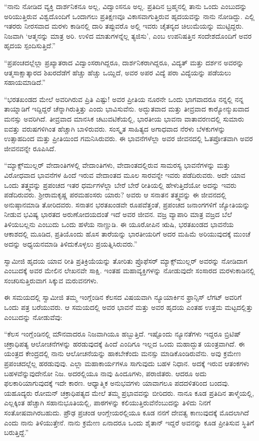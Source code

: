  “ನಾನು ನೋಡಿದ ವ್ಯಕ್ತಿ ದಾರ್ಶನಿಕನೂ ಅಲ್ಲ, ವಿದ್ವಾಂಸನೂ ಅಲ್ಲ. ಪ್ರತಿದಿನ ಬ್ರಹ್ಮನಲ್ಲಿ ತಾನು ಒಂದು ಎಂಬುದನ್ನು ಅರಿಯುತ್ತಿರುವ ವಿಶ್ವದೊಂದಿಗೆ ಒಂದಾಗಲು ಪ್ರತಿಕ್ಷಣವೂ ವಿಕಾಸವಾಗುತ್ತಿರುವ ಹೃದಯವನ್ನು ನಾನು ನೋಡಿದ್ದು. ಎಲ್ಲಿ ಇತರರು ನೀರಸವಾದ ಮರಳು ಕಾಡಿನಲ್ಲಿ ದಾರಿ ತಪ್ಪುವರೊ ಅಲ್ಲಿ ಇವರು ಚೈತನ್ಯದ ಚಿಲುಮೆಯನ್ನು ಮುಟ್ಟಿದ್ದರು. ನಿಜವಾಗಿ ‘ಆತ್ಮನನ್ನು ಮಾತ್ರ ಅರಿ. ಉಳಿದ ಮಾತುಗಳನ್ನೆಲ್ಲ ತ್ಯಜಿಸು’, ಎಂಬ ಉಪನಿಷತ್ತಿನ ಸಂದೇಶದೊಂದಿಗೆ ಅವರ ಹೃದಯ ಸ್ಪಂದಿಸುತ್ತಿದೆ.” 

 “ಪ್ರಪಂಚದಲ್ಲೆಲ್ಲಾ ಪ್ರಖ್ಯಾತರಾದ ವಿದ್ವಾಂಸರಾಗಿದ್ದರೂ, ದಾರ್ಶನಿಕರಾಗಿದ್ದರೂ, ವಿದ್ಯತ್ ಮತ್ತು ದರ್ಶನ ಅವರನ್ನು ಆತ್ಮಸಾಕ್ಷಾತ್ಕಾರದ ಶಿಖರದೆಡೆಗೆ ಹೆಚ್ಚು ಹೆಚ್ಚು ಒಯ್ದಿದೆ, ಅವರ ಅಪರ ವಿದ್ಯೆ ಪರಾ ವಿದ್ಯೆಯನ್ನು ಪಡೆಯಲು ಸಹಾಯಮಾಡಿದೆ.” 

 “ಭರತಖಂಡದ ಮೇಲೆ ಅವರಿಗಿರುವ ಪ್ರಿತಿ ಎಷ್ಟು! ಅವರ ಪ್ರೀತಿಯ ನೂರನೇ ಒಂದು ಭಾಗವಾದರೂ ನನ್ನಲ್ಲಿ ನನ್ನ ತಾಯ್ನಾಡಿಗೆ ಇದ್ದಿದ್ದರೆ ಚೆನ್ನಾಗಿರುತ್ತಿತ್ತು ಎಂದು ಭಾವಿಸುವೆನು. ಅದ್ಭುತವಾದ ಮತ್ತು ತೀವ್ರವಾದ ಕಾರ‍್ಯೋನ್ಮುಖವಾದ ಮನಸ್ಸು ಅವರಿಗಿದೆ. ತೀವ್ರವಾದ ಮಾನಸಿಕ ಚಟುವಟಿಕೆಯಲ್ಲಿ, ಭಾರತೀಯ ಭಾವನಾ ವಾತಾವರಣದಲ್ಲಿ ಸುಮಾರು ಐವತ್ತು ವರುಷಗಳಿಗಿಂತ ಹೆಚ್ಚಾಗಿ ಬಾಳಿರುವರು. ಸಂಸ್ಕೃತ ಸಾಹಿತ್ಯದ ಅಗಾಧವಾದ ನೆರಳು ಬೆಳಕುಗಳನ್ನು ಉತ್ಸಾಹದಿಂದ ಮತ್ತು ಪ್ರೀತಿಯಿಂದ ಗಮನಿಸಿರುವರು. ಈ ಭಾವನೆಗಳೆಲ್ಲಾ ಅವರ ಜೀವನದಲ್ಲಿ ಓತಪ್ರೋತವಾಗಿ ಅವರ ಜೀವನವನ್ನೇ ರೂಪಿಸಿದೆ. 

 “ಮ್ಯಾಕ್ಸ್‌ಮುಲ್ಲರ್ ವೇದಾಂತಿಗಳಲ್ಲಿ ವೇದಾಂತಿಗಳು, ವೇದಾಂತದಲ್ಲಿರುವ ಸಾಮರಸ್ಯ ಭಾವನೆಗಳನ್ನು ಮತ್ತು ವಿರೋಧವಾದ ಭಾವನೆಗಳ ಹಿಂದೆ ಇರುವ ವೇದಾಂತದ ಮೂಲ ಸಾರವನ್ನೇ ಇವರು ಪಡೆದಿರುವರು. ಅದೇ ಯಾವ ಒಂದು ತತ್ತ್ವವನ್ನು ಪ್ರಪಂಚದ ಇತರ ಧರ್ಮಗಳೆಲ್ಲಾ ಬೇರೆ ಬೇರೆ ರೀತಿಯಲ್ಲಿ ಹೇಳುತ್ತಿದೆಯೋ ಅದನ್ನು ಇವರು ಪಡೆದಿರುವರು. ಶ‍್ರೀರಾಮಕೃಷ್ಣ ಪರಮಹಂಸರು ಯಾರು? ಅವರು ಆ ಸನಾತನ ತತ್ತ್ವವನ್ನು ಈ ಜೀವನದಲ್ಲಿ ಅನುಷ್ಠಾನಮಾಡಿ ತೋರಿದವರು. ಸನಾತನ ಭರತಖಂಡವೇ ರೂಪವೆತ್ತಂತೆ, ಪ್ರಪಂಚದ ಜನಾಂಗಗಳಿಗೆ ಜ್ಯೋತಿಯನ್ನು ನೀಡುವ ಭವಿಷ್ಯ ಭಾರತದ ಅರುಣೋದಯದಂತೆ ಇದೆ ಅವರ ಜೀವನ. ವಜ್ರ ವ್ಯಾಪಾರಿ ಮಾತ್ರ ವಜ್ರದ ಬೆಲೆ ತಿಳಿಯಬಲ್ಲನು ಎಂಬುದು ಒಂದು ಹಳೆಯ ನಾಣ್ಣುಡಿ. ಈ ಯೂರೋಪಿನ ಋಷಿ, ಭರತಖಂಡದ ಭಾವನೆಯ ಆಕಾಶದಲ್ಲಿ ಮೂಡಿದ, ಪ್ರತಿಯೊಂದು ಹೊಸ ತಾರೆಯನ್ನು ಭಾರತೀಯರಿಗೆ ಅದರ ಮಹಿಮೆ ಅರಿಯುವುದಕ್ಕೆ ಮುಂಚೆ ಅದನ್ನು ಅಧ್ಯಯನಮಾಡಿ ತಿಳಿದುಕೊಳ್ಳಲು ಪ್ರಯತ್ನಿಸಿರುವರು.” 

 ಸ್ವಾಮೀಜಿ ಹೃದಯ ಯಾವ ರೀತಿ ಪ್ರತಿಕ್ರಿಯೆಯನ್ನು ತೋರಿತು ಪ್ರೊಫೆಸರ್ ಮ್ಯಾಕ್ಸ್‌ಮುಲ್ಲರ್ ಅವರನ್ನು ನೋಡಿದಾಗ ಎಂಬುದಕ್ಕೆ ಅವರ ಮೇಲಿನ ಲೇಖನವೇ ಸಾಕ್ಷಿ. ಇಂತಹ ಮಹಾವ್ಯಕ್ತಿಗಳನ್ನು ನೋಡುವುದೇ ಸಂಸಾರದ ಮರಳುಕಾಡಿನಲ್ಲಿ ಸಂಚರಿಸುತ್ತಿರುವಾಗ ಸಿಕ್ಕುವ ಮರುವನಗಳು. 

 ಈ ಸಮಯದಲ್ಲಿ ಸ್ವಾಮೀಜಿ ತಮ್ಮ ಇಂಗ್ಲೆಂಡಿನ ಕೆಲಸದ ವಿಷಯವಾಗಿ ನ್ಯೂಯಾರ್ಕಿನ ಫ್ರಾನ್ಸಿಸ್ ಲೆಗಟ್ ಅವರಿಗೆ ಒಂದು ಪತ್ರ ಬರೆಯುವರು. ಆ ಸಮಯದಲ್ಲಿ ಅವರ ಭಾವನೆ ಮತ್ತು ಅವರ ಹೃದಯ ಎಂತಹ ಉತ್ತಮ ಮಟ್ಟದಲ್ಲಿತ್ತು ಎಂಬುದನ್ನು ನೋಡುವೆವು: 

 “ಕೆಲಸ ಇಂಗ್ಲೆಂಡಿನಲ್ಲಿ ಮೌನವಾದರೂ ನಿಜವಾಗಿಯೂ ಹಬ್ಬುತ್ತಿದೆ. ಇಷ್ಟೊಂದು ನ್ಯೂನತೆಗಳು ಇದ್ದರೂ ಬ್ರಿಟಿಷ್ ಚಕ್ರಾಧಿಪತ್ಯ ಆಲೋಚನೆಗಳನ್ನು ಹರಡುವುದಕ್ಕೆ ಹಿಂದೆ ಎಂದಿಗೂ ಇಲ್ಲದ ಒಂದು ಮಹಾದ್ಭುತ ಯಂತ್ರವಾಗಿದೆ. ಈ ಯಂತ್ರದ ಕೇಂದ್ರದಲ್ಲಿ ನಾನು ಆಲೋಚನೆಯನ್ನು ಹಾಕಬೇಕೆಂದು ಮನಸ್ಸು ಮಾಡಿಕೊಂಡಿರುವೆನು. ಅವು ಕ್ರಮೇಣ ಪ್ರಪಂಚದಲ್ಲೆಲ್ಲ ಹರಡುವುವು. ಎಲ್ಲಾ ಮಹಾಕಾರ್ಯಗಳೂ ಸಾಗುವುದು ಬಹಳ ನಿಧಾನ. ಅದಕ್ಕೆ ಇರುವ ಆತಂಕಗಳು ಬಹಳವೆನ್ನುವುದೇನೋ ನಿಜ. ಅದರಲ್ಲಿಯೂ ನಾವು ಹಿಂದೂಗಳು, ಪರಾಜಿತರು. ಆದರೂ ಅದು ಫಲಕಾರಿಯಾಗುವುದಕ್ಕೆ ಇದೇ ಕಾರಣ. ಆಧ್ಯಾತ್ಮಿಕ ಅನುಭವಗಳು ಯಾವಾಗಲೂ ಪದದಳಿತರಿಂದ ಬಂದವು. ಯಹೂದ್ಯರು ರೋಮನ್ ಚಕ್ರಾಧಿಪತ್ಯದ ಮೇಲೆ ತಮ್ಮ ಪ್ರಭಾವವನ್ನು ಬೀರಿದರು. ನಾನೂ ಕೂಡ ಪ್ರತಿದಿನ ತಾಳ್ಮೆಯಲ್ಲಿ, ಎಲ್ಲಕ್ಕಿಂತ ಹೆಚ್ಚಾಗಿ ಸಹಾನುಭೂತಿಯಲ್ಲಿ, ಪಾಠಗಳನ್ನು ಕಲಿಯುತ್ತಿರುವೆನೆಂಬುದನ್ನು ತಿಳಿದು ನಿನಗೆ ಸಂತೋಷವಾಗಿರಬಹುದು. ಪ್ರೌಢ ಪ್ರಚಂಡ ಆಂಗ್ಲೇಯರಲ್ಲಿಯೂ ಕೂಡ ನನಗೆ ದೇವತ್ವ ಕಾಣುವುದಕ್ಕೆ ಮೊದಲಾಗಿದೆ ಎಂದು ನಾನು ತಿಳಿಯುತ್ತೇನೆ. ನಾನು ಕ್ರಮೇಣ ಏನಾದರೂ ಒಂದು ಶೈತಾನ್ ಇದ್ದರೆ ಅವನನ್ನು ಕೂಡ ಪ್ರೀತಿಸುವ ಸ್ಥಿತಿಗೆ ಬರುತ್ತಿದ್ದೆ.” 

